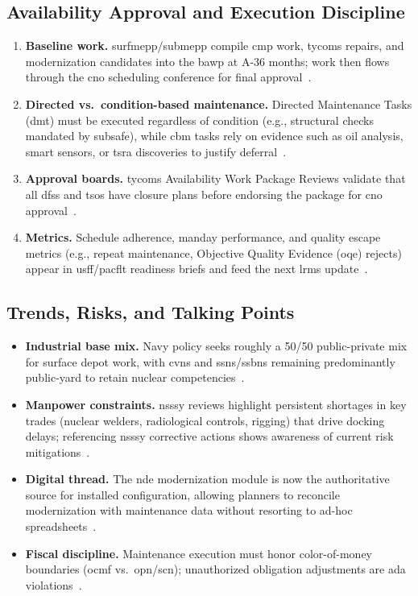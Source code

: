 \documentclass[../main.tex]{subfiles}
\begin{document}
\subsection{Availability Approval and Execution Discipline}
\begin{enumerate}
\item \textbf{Baseline work.} \ac{surfmepp}/\ac{submepp} compile \ac{cmp} work, \acp{tycom} repairs, and modernization candidates into the \ac{bawp} at A-36 months; work then flows through the \ac{cno} scheduling conference for final approval~\autocite{OPNAVNOTE4700-24,edo-4-1-3-fleet-maint-policy-2025}.
\item \textbf{Directed vs.\ condition-based maintenance.} Directed Maintenance Tasks (\ac{dmt}) must be executed regardless of condition (e.g., structural checks mandated by \ac{subsafe}), while \ac{cbm} tasks rely on evidence such as oil analysis, smart sensors, or \ac{tsra} discoveries to justify deferral~\autocite{OPNAVINST4700-7M,OPNAVINST4790-16G}.
\item \textbf{Approval boards.} \acp{tycom} Availability Work Package Reviews validate that all \acp{dfs} and \acp{tso} have closure plans before endorsing the package for \ac{cno} approval~\autocite{COMFLTFORCOMINST4790-3}.
\item \textbf{Metrics.} Schedule adherence, manday performance, and quality escape metrics (e.g., repeat maintenance, Objective Quality Evidence (\ac{oqe}) rejects) appear in \ac{usff}/\ac{pacflt} readiness briefs and feed the next \ac{lrms} update~\autocite{edo-4-1-3-fleet-maint-policy-2025}.
\end{enumerate}

\subsection{Trends, Risks, and Talking Points}
\begin{itemize}
\item \textbf{Industrial base mix.} Navy policy seeks roughly a 50/50 public-private mix for surface depot work, with \acp{cvn} and \acp{ssn}/\acp{ssbn} remaining predominantly public-yard to retain nuclear competencies~\autocite{OPNAVINST4700-7M}.
\item \textbf{Manpower constraints.} \ac{nsssy} reviews highlight persistent shortages in key trades (nuclear welders, radiological controls, rigging) that drive docking delays; referencing \ac{nsssy} corrective actions shows awareness of current risk mitigations~\autocite{edo-4-1-3-fleet-maint-policy-2025}.
\item \textbf{Digital thread.} The \ac{nde} modernization module is now the authoritative source for installed configuration, allowing planners to reconcile modernization with maintenance data without resorting to ad-hoc spreadsheets~\autocite{TS9090-310}.
\item \textbf{Fiscal discipline.} Maintenance execution must honor color-of-money boundaries (\ac{ocmf} vs.\ \ac{opn}/\ac{scn}); unauthorized obligation adjustments are \ac{ada} violations~\autocite{DoDFMR-Vol3,FAR}.
\end{itemize}

\end{document}

